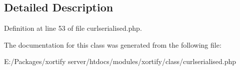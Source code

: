 \subsection{Detailed Description}


Definition at line 53 of file curlserialised.\-php.



The documentation for this class was generated from the following file\-:\begin{DoxyCompactItemize}
\item 
E\-:/\-Packages/xortify server/htdocs/modules/xortify/class/curlserialised.\-php\end{DoxyCompactItemize}
